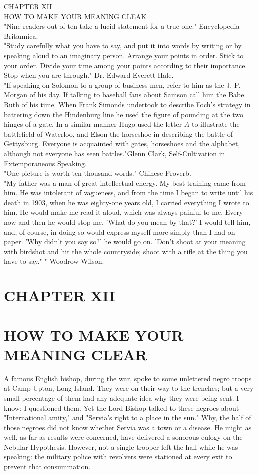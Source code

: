 \documentclass[10pt]{article}
\begin{document}
CHAPTER XII\\
HOW TO MAKE YOUR MEANING CLEAK\\
"Nine readers out of ten take a lucid statement for a true one."-Encyclopedia Britannica.\\
"Study carefully what you have to say, and put it into words by writing or by speaking aloud to an imaginary person. Arrange your points in order. Stick to your order. Divide your time among your points according to their importance. Stop when you are through."-Dr. Edward Everett Hale.\\
"If speaking on Solomon to a group of business men, refer to him as the J. P. Morgan of his day. If talking to baseball fans about Samson call him the Babe Ruth of his time. When Frank Simonds undertook to describe Foch's strategy in battering down the Hindenburg line he used the figure of pounding at the two hinges of a gate. In a similar manner Hugo used the letter $A$ to illustrate the battlefield of Waterloo, and Elson the horseshoe in describing the battle of Gettysburg. Everyone is acquainted with gates, horseshoes and the alphabet, although not everyone has seen battles."Glenn Clark, Self-Cultivation in Extemporaneous Speaking.\\
"One picture is worth ten thousand words."-Chinese Proverb.\\
"My father was a man of great intellectual energy. My best training came from him. He was intolerant of vagueness, and from the time I began to write until his death in 1903, when he was eighty-one years old, I carried everything I wrote to him. He would make me read it aloud, which was always painful to me. Every now and then he would stop me. 'What do you mean by that?' I would tell him, and, of course, in doing so would express myself more simply than I had on paper. 'Why didn't you say so?' he would go on. 'Don't shoot at your meaning with birdshot and hit the whole countryside; shoot with a rifle at the thing you have to say." "-Woodrow Wilson.

\section*{CHAPTER XII}
\section*{HOW TO MAKE YOUR MEANING CLEAR}
A famous English bishop, during the war, spoke to some unlettered negro troops at Camp Upton, Long Island. They were on their way to the trenches; but a very small percentage of them had any adequate idea why they were being sent. I know: I questioned them. Yet the Lord Bishop talked to these negroes about "International amity," and "Servia's right to a place in the sun." Why, the half of those negroes did not know whether Servia was a town or a disease. He might as well, as far as results were concerned, have delivered a sonorous eulogy on the Nebular Hypothesis. However, not a single trooper left the hall while he was speaking: the military police with revolvers were stationed at every exit to prevent that consummation.
\end{document}

